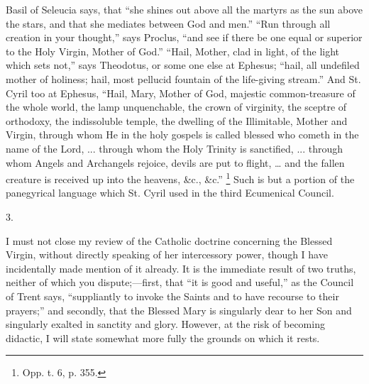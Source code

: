 Basil of Seleucia says, that ``she shines out above all the
martyrs as the sun above the stars, and that she mediates between God
and men.'' ``Run through all creation in your thought,''
says Proclus, ``and see if there be one equal or superior to the
Holy Virgin, Mother of God.'' ``Hail, Mother, clad in light, of
the light which sets not,'' says Theodotus, or some one else at
Ephesus; ``hail, all undefiled mother of holiness; hail, most
pellucid fountain of the life-giving stream.'' And St. Cyril too at
Ephesus, ``Hail, Mary, Mother of God, majestic common-treasure of
the whole world, the lamp unquenchable, the crown of virginity, the
sceptre of orthodoxy, the indissoluble temple, the dwelling of the
Illimitable, Mother and Virgin, through whom He in the holy gospels is
called blessed who cometh in the name of the Lord, ... through whom the
Holy Trinity is sanctified, ... through whom Angels and Archangels
rejoice, devils are put to flight, … and the fallen creature is
received up into the heavens, \&c., \&c.'' \footnote{Opp. t. 6, p.
355.} Such is but a portion of the panegyrical language which St.
Cyril used in the third Ecumenical Council.

3.

I must not close my review of the Catholic doctrine concerning the
Blessed Virgin, without directly speaking of her intercessory power,
though I have incidentally made mention of it already. It is the
immediate result of two truths, neither of which you dispute;—first,
that ``it is good and useful,'' as the Council of Trent says,
``suppliantly to invoke the Saints and to have recourse to their
prayers;'' and secondly, that the Blessed Mary is singularly dear to
her Son and singularly exalted in sanctity and glory. However, at the
risk of becoming didactic, I will state somewhat more fully the grounds
on which it rests.

